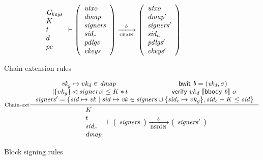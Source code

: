 \begin{figure}
\begin{equation}
{{\begin{array}{l}
         \Gkeys\\
         K\\
         t\\
         d\\
         pc
      \end{array}}
      \vdash
      {
        \left(
          \begin{array}{l}
            \var{utxo}\\
            \var{dmap}\\
            \var{signers}\\
            \var{sid_c}\\
            \var{pdlgs}\\
            \var{ekeys}
          \end{array}
        \right)
      }
      \trans{chain}{b}
      {
        \left(
          \begin{array}{l}
            \var{utxo}\\
            \var{dmap'}\\
            \var{signers'}\\
            \var{sid_n}\\
            \var{pdlgs'}\\
            \var{ekeys'}
          \end{array}
        \right)
      }
    }
  \end{equation}
  \caption{Chain extension rules}
  \label{fig:rules:chain-extension}
\end{figure}


\begin{figure}
  \begin{equation}
    \label{eq:rule:block-signing}
    \inference[Chain-ext]
    {\var{vk_g} \mapsto vk_d \in \var{dmap} & \bwit{b} = (\var{vk_d}, \sigma)\\
      \size{\{vk_g\} \restrictdom signers} \leq K * t &
      \verify{vk_d}{\serialised{\bbody{b}}}{\sigma} \\
      \var{signers'} =
         \{ \var{sid} \mapsto \var{vk}
          \mid  \var{sid} \mapsto \var{vk} \in \var{signers} \cup \{\var{sid_c} \mapsto vk_g\}
          , \var{sid_c} - K \leq \var{sid} \}
    }
    {
      {\begin{array}{l}
         K\\
         t\\
         \var{sid_c}\\
         \var{dmap}
      \end{array}}
      \vdash
      {
        \left(
          \begin{array}{l}
            \var{signers}
          \end{array}
        \right)
      }
      \trans{BSIGN}{b}
      {
        \left(
          \begin{array}{l}
            \var{signers'}
          \end{array}
        \right)
      }
    }
  \end{equation}
  \caption{Block signing rules}
  \label{fig:rules:block-signing}
\end{figure}

